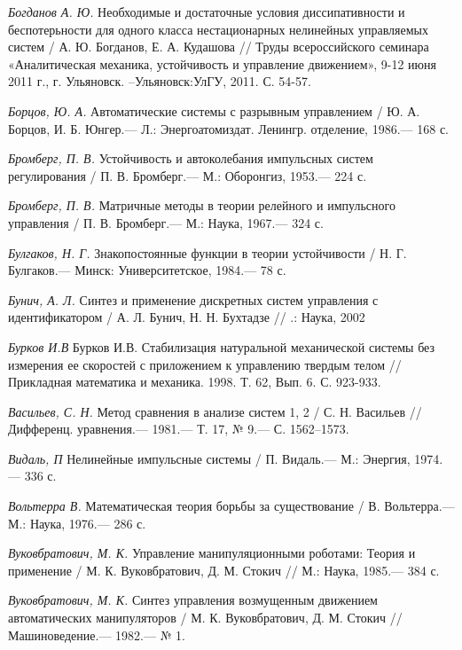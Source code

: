\begin{thebibliography}{10}
	{\it Богданов А. Ю.} Необходимые и достаточные условия диссипативности и беспотерьности для одного класса нестационарных нелинейных управляемых систем / А. Ю. Богданов, Е. А. Кудашова //
	Труды всероссийского семинара «Аналитическая механика, устойчивость и управление движением», 9-12 июня 2011 г., г. Ульяновск. –Ульяновск:УлГУ, 2011. С. 54-57.
	
	
	{\it Борцов, Ю. А.} Автоматические системы с разрывным управлением / Ю. А. Борцов,
	И. Б. Юнгер.— Л.: Энергоатомиздат. Ленингр. отделение, 1986.— 168 с.
	
	{\it Бромберг, П. В.} Устойчивость и автоколебания импульсных систем регулирования /
	П. В. Бромберг.— М.: Оборонгиз, 1953.— 224 с.
	
	{\it Бромберг, П. В.} Матричные методы в теории релейного и импульсного управления /
	П. В. Бромберг.— М.: Наука, 1967.— 324 с.
	
	{\it Булгаков, Н. Г.} Знакопостоянные функции в теории устойчивости /
	Н. Г. Булгаков.— Минск: Университетское, 1984.— 78 с.
	
	{\it Бунич, А. Л.} Синтез и применение дискретных систем управления с идентификатором /
	А. Л. Бунич, Н. Н. Бухтадзе // .: Наука, 2002
	
	{\it Бурков И.В} Бурков И.В. Стабилизация натуральной механической системы без измерения ее скоростей с приложением к управлению твердым телом // Прикладная математика и механика. 1998. Т. 62, Вып. 6. С. 923-933.
	
	{\it Васильев, С. Н.} Метод сравнения в анализе систем 1, 2 / С. Н. Васильев // Дифференц.
	уравнения.— 1981.— Т. 17, № 9.— С. 1562–1573.
	
	{\it Видаль, П} Нелинейные импульсные системы / П. Видаль.— М.: Энергия, 1974.— 336 с.
	
	{\it Вольтерра В.} Математическая теория борьбы за существование /
	В. Вольтерра.— М.: Наука, 1976.— 286 с.
	
	{\it Вуковбратович, М. К.} Управление манипуляционными роботами: Теория и применение /
	М. К. Вуковбратович, Д. М. Стокич // М.: Наука, 1985.— 384 с.
	
	{\it Вуковбратович, М. К.} Синтез управления возмущенным движением автоматических манипуляторов /
	М. К. Вуковбратович, Д. М. Стокич // Машиноведение.— 1982.— № 1.
	

\end{thebibliography}
